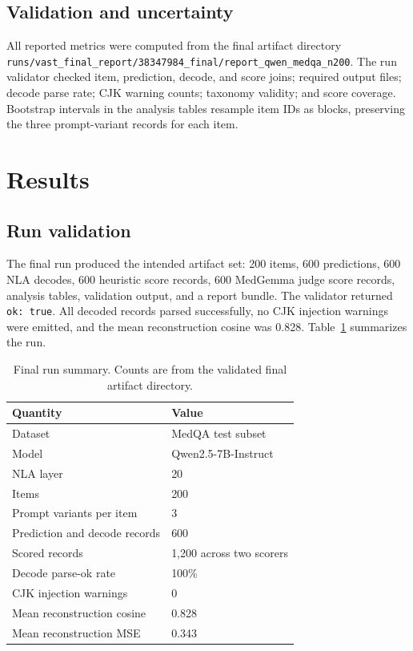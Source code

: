 \documentclass{article}
\newcommand{\runpath}{\texttt{runs/vast\_final\_report/38347984\_final/report\_qwen\_medqa\_n200}}
\begin{document}
\subsection{Validation and uncertainty}

All reported metrics were computed from the final artifact directory \runpath. The run validator checked item, prediction, decode, and score joins; required output files; decode parse rate; CJK warning counts; taxonomy validity; and score coverage. Bootstrap intervals in the analysis tables resample item IDs as blocks, preserving the three prompt-variant records for each item.

\section{Results}

\subsection{Run validation}

The final run produced the intended artifact set: 200 items, 600 predictions, 600 NLA decodes, 600 heuristic score records, 600 MedGemma judge score records, analysis tables, validation output, and a report bundle. The validator returned \texttt{ok: true}. All decoded records parsed successfully, no CJK injection warnings were emitted, and the mean reconstruction cosine was 0.828. Table~\ref{tab:run-summary} summarizes the run.

\begin{table}[t]
\caption{Final run summary. Counts are from the validated final artifact directory.}
\label{tab:run-summary}
\centering
\begin{tabular}{ll}
\toprule
Quantity & Value \\
\midrule
Dataset & MedQA test subset \\
Model & Qwen2.5-7B-Instruct \\
NLA layer & 20 \\
Items & 200 \\
Prompt variants per item & 3 \\
Prediction and decode records & 600 \\
Scored records & 1,200 across two scorers \\
Decode parse-ok rate & 100\% \\
CJK injection warnings & 0 \\
Mean reconstruction cosine & 0.828 \\
Mean reconstruction MSE & 0.343 \\
\bottomrule
\end{tabular}
\end{table}
\end{document}
